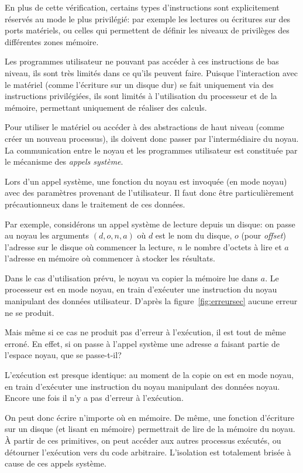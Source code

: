 En plus de cette vérification, certains types d'instructions sont explicitement
réservés au mode le plus privilégié: par exemple les lectures ou écritures sur
des ports matériels, ou celles qui permettent de définir les niveaux de
privilèges des différentes zones mémoire.

Les programmes utilisateur ne pouvant pas accéder à ces instructions de bas
niveau, ils sont très limités dans ce qu'ils peuvent faire. Puisque
l'interaction avec le matériel (comme l'écriture sur un disque dur) se fait
uniquement via des instructions privilégiées, ils sont limités à l'utilisation
du processeur et de la mémoire, permettant uniquement de réaliser des calculs.

Pour utiliser le matériel ou accéder à des abstractions de haut niveau (comme
créer un nouveau processus), ils doivent donc passer par l'intermédiaire du
noyau. La communication entre le noyau et les programmes utilisateur est
constituée par le mécanisme des \emph{appels système}.

Lors d'un appel système, une fonction du noyau est invoquée (en mode noyau) avec
des paramètres provenant de l'utilisateur. Il faut donc être particulièrement
précautionneux dans le traitement de ces données.

Par exemple, considérons un appel système de lecture depuis un disque: on passe
au noyau les arguments $(d, o, n, a)$ où $d$ est le nom du disque, $o$ (pour
\emph{offset}) l'adresse sur le disque où commencer la lecture, $n$ le nombre
d'octets à lire et $a$ l'adresse en mémoire où commencer à stocker les
résultats.

Dans le cas d'utilisation prévu, le noyau va copier la mémoire lue dans $a$. Le
processeur est en mode noyau, en train d'exécuter une instruction du noyau
manipulant des données utilisateur. D'après la figure~\ref{fig:erreursec} aucune
erreur ne se produit.

Mais même si ce cas ne produit pas d'erreur à l'exécution, il est tout de même
erroné. En effet, si on passe à l'appel système une adresse $a$ faisant partie
de l'espace noyau, que se passe-t-il?

L'exécution est presque identique: au moment de la copie on est en mode noyau,
en train d'exécuter une instruction du noyau manipulant des données noyau.
Encore une fois il n'y a pas d'erreur à l'exécution.

On peut donc écrire n'importe où en mémoire. De même, une fonction d'écriture
sur un disque (et lisant en mémoire) permettrait de lire de la mémoire du noyau.
À partir de ces primitives, on peut accéder aux autres processus exécutés, ou
détourner l'exécution vers du code arbitraire. L'isolation est totalement
brisée à cause de ces appels système.


